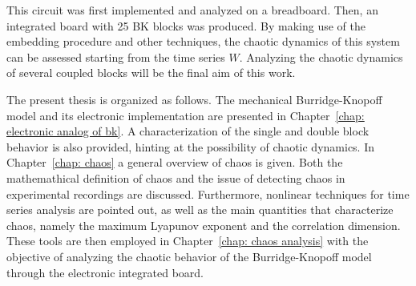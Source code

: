 This circuit was first implemented and analyzed on a breadboard.
Then, an integrated board with 25 BK blocks was produced. By making use of the embedding procedure
and other techniques, the chaotic dynamics of this system can be assessed starting from the time
series $W$. Analyzing the chaotic dynamics of several coupled blocks will be the final aim of this work.

The present thesis is organized as follows. The mechanical Burridge-Knopoff model and its electronic
implementation are presented in Chapter~\ref{chap: electronic analog of bk}. A characterization of the
single and double block behavior is also provided, hinting at the possibility of chaotic dynamics.
In Chapter~\ref{chap: chaos} a general overview of chaos is given. Both the mathemathical definition
of chaos and the issue of detecting chaos in experimental recordings are discussed. Furthermore,
nonlinear techniques for time series analysis are pointed out, as well as the main quantities that
characterize chaos, namely the maximum Lyapunov exponent and the correlation dimension.
These tools are then employed in Chapter~\ref{chap: chaos analysis} with the objective of analyzing
the chaotic behavior of the Burridge-Knopoff model through the electronic integrated board.














